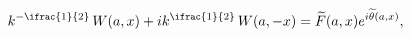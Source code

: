 \[k^{-\ifrac{1}{2}}\mathop{W\/}\nolimits\!\left(a,x\right)+ik^{\ifrac{1}{2}}%
\mathop{W\/}\nolimits\!\left(a,-x\right)=\widetilde{F}(a,x)e^{i\widetilde{%
\theta}(a,x)},\]